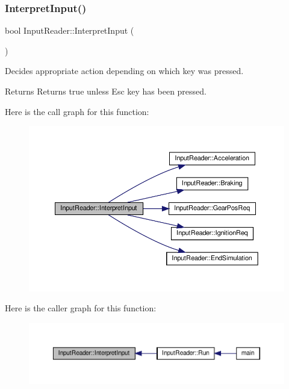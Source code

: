 \subsubsection{\texorpdfstring{Interpret\+Input()}{InterpretInput()}}
{\footnotesize\ttfamily bool Input\+Reader\+::\+Interpret\+Input (\begin{DoxyParamCaption}{ }\end{DoxyParamCaption})}

Decides appropriate action depending on which key was pressed. \begin{DoxyReturn}{Returns}
Returns true unless Esc key has been pressed. 
\end{DoxyReturn}
Here is the call graph for this function\+:
\nopagebreak
\begin{figure}[H]
\begin{center}
\leavevmode
\includegraphics[width=350pt]{classInputReader_a83a83d74ccb7cd6a29da3b558babaf1c_cgraph}
\end{center}
\end{figure}
Here is the caller graph for this function\+:
\nopagebreak
\begin{figure}[H]
\begin{center}
\leavevmode
\includegraphics[width=350pt]{classInputReader_a83a83d74ccb7cd6a29da3b558babaf1c_icgraph}
\end{center}
\end{figure}
\mbox{\label{classInputReader_a541f5d60fa0d9ee786d82f1541485a4a}} 

